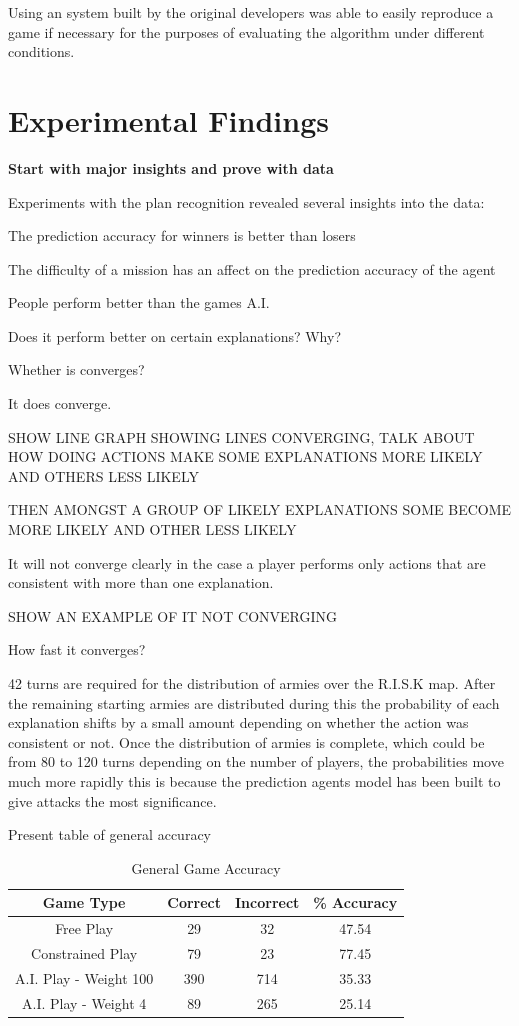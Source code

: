 \documentclass[parskip]{cs4rep}
\begin{document}
Using an system built by the original developers was able to easily reproduce a game if necessary for the purposes of evaluating the algorithm under different conditions.

\section{Experimental Findings}

\textbf{Start with major insights and prove with data}

Experiments with the plan recognition revealed several insights into the data:

The prediction accuracy for winners is better than losers

The difficulty of a mission has an affect on the prediction accuracy of the agent

People perform better than the games A.I.

Does it perform better on certain explanations? Why?

Whether is converges?

It does converge.

SHOW LINE GRAPH SHOWING LINES CONVERGING, TALK ABOUT HOW DOING ACTIONS MAKE SOME EXPLANATIONS MORE LIKELY AND OTHERS LESS LIKELY

THEN AMONGST A GROUP OF LIKELY EXPLANATIONS SOME BECOME MORE LIKELY AND OTHER LESS LIKELY

It will not converge clearly in the case a player performs only actions that are consistent with more than one explanation.

SHOW AN EXAMPLE OF IT NOT CONVERGING

How fast it converges?

42 turns are required for the distribution of armies over the R.I.S.K map. After the remaining starting armies are distributed during this the probability of each explanation shifts by a small amount depending on whether the action was consistent or not. Once the distribution of armies is complete, which could be from 80 to 120 turns depending on the number of players, the probabilities move much more rapidly this is because the prediction agents model has been built to give attacks the most significance.

Present table of general accuracy

\begin{table}[ht]
\centering
\begin{tabular}{|c|c|c|c|}
\hline 
\textbf{Game Type} & \textbf{Correct} & \textbf{Incorrect} & \textbf{\% Accuracy} \\ 
\hline 
Free Play & 29 & 32 & 47.54 \\ 
\hline 
Constrained Play & 79 & 23 & 77.45 \\ 
\hline 
A.I. Play - Weight 100 & 390 & 714 & 35.33 \\ 
\hline 
A.I. Play - Weight 4 & 89 & 265 & 25.14 \\
\hline 
\end{tabular}
\caption{General Game Accuracy}
\label{table:general-game-accuracy}
\end{table}
\end{document}

